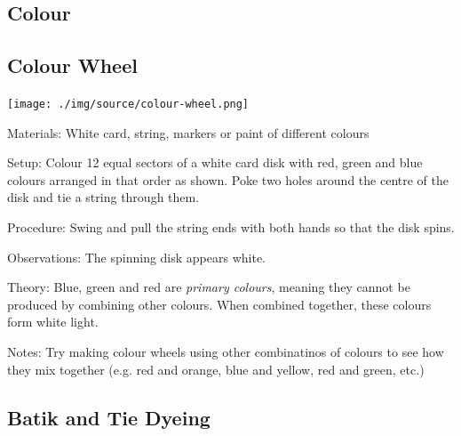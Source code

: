 \begin{multicols}{2}


\section*{Colour}


\subsection{Colour Wheel}

\begin{center}
\texttt{[image: ./img/source/colour-wheel.png]}
\end{center}

\begin{description*}
\item[Materials:]{White card, string, markers or paint of different colours}
\item[Setup:]{Colour 12 equal sectors of a white card disk with red, green and blue colours arranged in that order as shown. Poke two holes around the centre of the disk and tie a string through them.}
\item[Procedure:]{Swing and pull the string ends with both hands so that the disk spins.}
\item[Observations:]{The spinning disk appears white.}
\item[Theory:]{Blue, green and red are \emph{primary colours}, meaning they cannot be produced by combining other colours. When combined together, these colours form white light.}
\item[Notes:]{Try making colour wheels using other combinatinos of colours to see how they mix together (e.g. red and orange, blue and yellow, red and green, etc.)}
\end{description*}

\vfill
\columnbreak

\subsection{Batik and Tie Dyeing}


\end{multicols}
